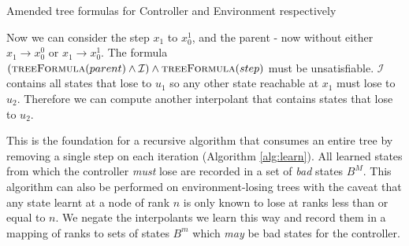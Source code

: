 \documentclass{llncs}
\newcommand{\textoverline}[1]{$\overline{\mbox{#1}}$}
\begin{document}
\begin{algorithm}
    \caption{Amended tree formulas for Controller and Environment respectively}
    \label{alg:unboundedTreeFormula}
    \begin{algorithmic}[1]
        \State {}
        \Else
        \State {}
        \EndIf
        \EndFunction
    \end{algorithmic}

    \begin{algorithmic}
        \Function{\textoverline{treeFormula}}{gt}
        \State {}
        \Else
        \State {}
        \EndIf
        \EndFunction
    \end{algorithmic}
\end{algorithm}

Now we can consider the step $x_1$ to $x_0^1$, and the parent - now without
either $x_1 \to x_0^0$ or $x_1 \to x_0^1$. The formula
$(\textsc{treeFormula}(parent) \land \mathcal{I}) \land
\textsc{treeFormula}(step)$ must be unsatisfiable. $\mathcal{I}$ contains all
states that lose to $u_1$ so any other state reachable at $x_1$ must lose to
$u_2$. Therefore we can compute another interpolant that contains states that
lose to $u_2$.

This is the foundation for a recursive algorithm that consumes an entire tree
by removing a single step on each iteration (Algorithm \ref{alg:learn}). All
learned states from which the controller \emph{must} lose are recorded in a set
of \emph{bad} states $B^M$.  This algorithm can also be performed on
environment-losing trees with the caveat that any state learnt at a node of
rank $n$ is only known to lose at ranks less than or equal to $n$. We negate
the interpolants we learn this way and record them in a mapping of ranks to
sets of states $B^m$ which \emph{may} be bad states for the controller.
\end{document}
